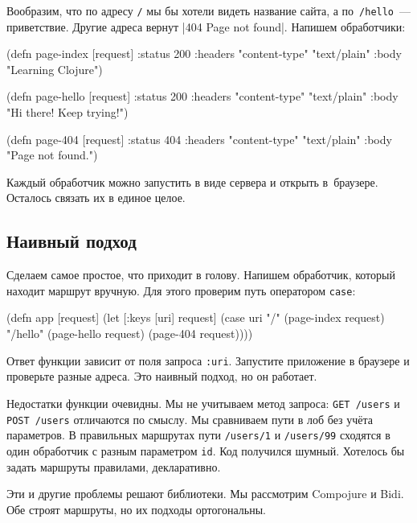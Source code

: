 Вообразим, что по адресу \verb|/| мы бы хотели видеть название сайта, а
по~\verb|/hello|~--- приветствие. Другие адреса вернут
\spverb|404 Page not found|. Напишем обработчики:

\begin{english}
  \begin{clojure}
(defn page-index [request]
  {:status 200
   :headers {"content-type" "text/plain"}
   :body "Learning Clojure"})

(defn page-hello [request]
  {:status 200
   :headers {"content-type" "text/plain"}
   :body "Hi there! Keep trying!"})

(defn page-404 [request]
  {:status 404
   :headers {"content-type" "text/plain"}
   :body "Page not found."})
  \end{clojure}
\end{english}

Каждый обработчик можно запустить в виде сервера и открыть в~браузере. Осталось
связать их в единое целое.

\subsection{Наивный подход}

Сделаем самое простое, что приходит в голову. Напишем обработчик, который
находит маршрут вручную. Для этого проверим путь оператором \verb|case|:

\begin{english}
  \begin{clojure}
(defn app [request]
  (let [{:keys [uri]} request]
    (case uri
      "/"      (page-index request)
      "/hello" (page-hello request)
      (page-404 request))))
  \end{clojure}
\end{english}

Ответ функции зависит от поля запроса \verb|:uri|. Запустите приложение в
браузере и проверьте разные адреса. Это наивный подход, но он работает.

\mnoindent Недостатки функции очевидны. Мы не учитываем метод запроса:
\verb|GET /users| и \verb|POST /users| отличаются по смыслу. Мы сравниваем пути
в лоб без учёта параметров. В правильных маршрутах пути \verb|/users/1| и
\verb|/users/99| сходятся в один обработчик с разным параметром \verb|id|. Код
получился шумный. Хотелось бы задать маршруты правилами, декларативно.

Эти и другие проблемы решают библиотеки. Мы рассмотрим Compojure и Bidi. Обе
строят маршруты, но их подходы ортогональны.

